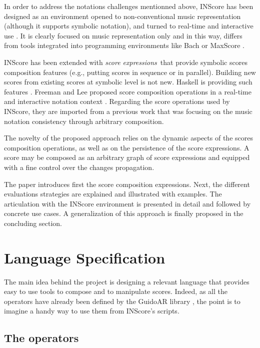 \documentclass{article}
\newcommand{\sExpr}{\emph{score expressions}}
\begin{document}
In order to address the notations challenges mentionned above, INScore \cite{Fober:12a,fober14c} has been designed as an environment opened to non-conventional music representation (although it supports symbolic notation), and turned to real-time and interactive use \cite{Fober:13b, Fober:14b}. It is clearly focused on music representation only and in this way, differs from tools integrated into programming environments like Bach \cite{agostini12b} or MaxScore \cite{didko08}. 

INScore has been extended with \sExpr\ that provide symbolic scores composition features (e.g., putting scores in sequence or in parallel). Building new scores from existing scores at symbolic  level is not new. Haskell is providing such features \cite{Quick:2013:GAM:2505341.2505345}. Freeman and Lee proposed score composition operations in a real-time and interactive notation context \cite{Lee:2013}. Regarding the score operations used by INScore, they are imported from a previous work \cite{fober12b} that was focusing on the music notation consistency through arbitrary composition. 

The novelty of the proposed approach relies on the dynamic aspects of the scores composition operations, as well as on the persistence of the score expressions. A score may be composed as an arbitrary graph of score expressions and equipped with a fine control over the changes propagation.

The paper introduces first the score composition expressions. Next, the different evaluations strategies are explained and illustrated with examples. The articulation with the INScore environment is presented in detail and followed by concrete use cases. A generalization of this approach is finally proposed in the concluding section.  


\section{Language Specification}\label{language}
\label{languageSpec}
The main idea behind the project is designing a relevant language that provides easy to use tools to compose and to manipulate scores. Indeed, as all the operators have already been defined by the GuidoAR library \cite{fober12b}, the point is to imagine a handy way to use them from INScore's scripts.

\subsection{The operators}
\end{document}
